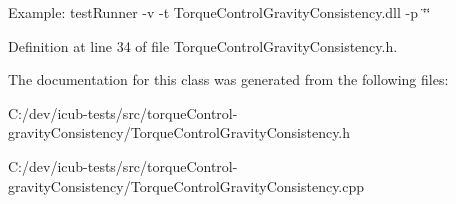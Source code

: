 Example\+: test\+Runner -\/v -\/t Torque\+Control\+Gravity\+Consistency.\+dll -\/p \char`\"{}\char`\"{} 

Definition at line 34 of file Torque\+Control\+Gravity\+Consistency.\+h.



The documentation for this class was generated from the following files\+:\begin{DoxyCompactItemize}
\item 
C\+:/dev/icub-\/tests/src/torque\+Control-\/gravity\+Consistency/Torque\+Control\+Gravity\+Consistency.\+h\item 
C\+:/dev/icub-\/tests/src/torque\+Control-\/gravity\+Consistency/Torque\+Control\+Gravity\+Consistency.\+cpp\end{DoxyCompactItemize}
